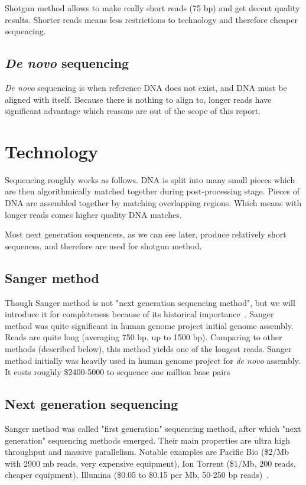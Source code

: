 \documentclass[english,11pt]{article}
\numberwithin{equation}{section}
\begin{document}
Shotgun method allows to make really short reads (75 bp) and get decent quality
results. Shorter reads means less restrictions to technology and therefore
cheaper sequencing.

\subsection{\emph{De novo} sequencing}

\emph{De novo} sequencing is when reference DNA does not exist, and DNA must be
aligned with itself. Because there is nothing to align to, longer reads have
significant advantage which reasons are out of the scope of this report.

\section{Technology}

Sequencing roughly works as follows. DNA is split into many small pieces which
are then algorithmically matched together during post-processing stage. Pieces
of DNA are assembled together by matching overlapping regions. Which means with
longer reads comes higher quality DNA matches.

Most next generation sequencers, as we can see later, produce relatively short
sequences, and therefore are used for shotgun method.

\subsection{Sanger method}

Though Sanger method is not "next generation sequencing method", but we will
introduce it for completeness because of its historical
importance~\cite{sanger}. Sanger method was quite significant in human genome
project initial genome assembly. Reads are quite long (averaging 750 bp, up to
1500 bp). Comparing to other methods (described below), this method yields one
of the longest reads. Sanger method initially was heavily used in human genome
project for \emph{de novo} assembly. It costs roughly \$2400-5000 to sequence
one million base pairs~\cite{ng-comparison}

\subsection{Next generation sequencing}

Sanger method was called "first generation" sequencing method, after which "next
generation" sequencing methods emerged. Their main properties are ultra high
throughput and massive parallelism. Notable examples are Pacific Bio (\$2/Mb
with 2900 mb reads, very expensive equipment), Ion Torrent (\$1/Mb, 200 reads,
cheaper equipment), Illumina (\$0.05 to \$0.15 per Mb, 50-250 bp
reads)~\cite{ng-comparison2}.
\end{document}
